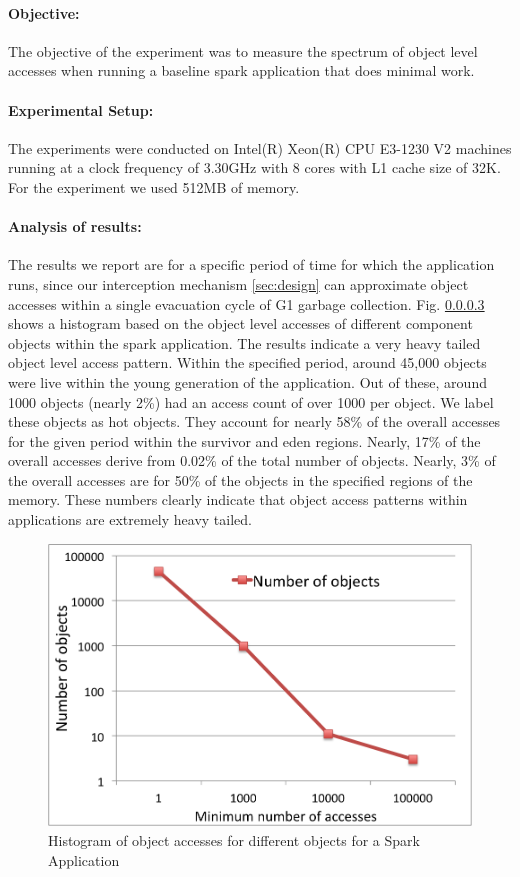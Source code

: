 \paragraph{Objective:}
The objective of the experiment was to measure the spectrum of object level accesses when running a baseline spark application that does minimal work. 
\paragraph{Experimental Setup:} 
The experiments were conducted on Intel(R) Xeon(R) CPU E3-1230 V2 machines running at a clock frequency of 3.30GHz with 8 cores with L1 cache size of 32K. For the experiment we used 512MB of memory.
\paragraph{Analysis of results:} 
The results we report are for a specific period of time for which the application runs, since our interception mechanism \ref{sec:design} can approximate object accesses within a single evacuation \cite{fig:exp6} cycle of G1 garbage collection.
Fig. \ref{} shows a histogram based on the object level accesses of different component objects within the spark application. The results indicate a very heavy tailed object level access pattern. Within the specified period, around 45,000 objects were live within the young generation of the application. Out of these, around 1000 objects (nearly 2\%) had an access count of over 1000 per object. We label these objects as hot objects. They account for nearly 58\% of the overall accesses for the given period within the survivor and eden regions. Nearly, 17\% of the overall accesses derive from 0.02\% of the total number of objects. Nearly, 3\% of the overall accesses are for 50\% of the objects in the specified regions of the memory.  These numbers clearly indicate that object access patterns within applications are extremely heavy tailed. 

\begin{figure}[!ht]
\caption{Histogram of object accesses for different objects for a Spark Application}
\label{fig:exp6}
\includegraphics[scale=0.50]{./images/exp6.png}
\end{figure}

